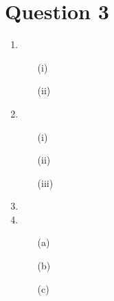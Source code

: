 \documentclass[10pt,a4paper]{article}
\begin{document}
\section*{Question 3}

\begin{enumerate}
	\item 
		\begin{itemize}
			\item[(i)]
			\item[(ii)]
		\end{itemize}
	\item
		\begin{itemize}
			\item[(i)]
			\item[(ii)]
			\item[(iii)]
		\end{itemize}
	\item
	\item
		\begin{itemize}
			\item[(a)]
			\item[(b)]
			\item[(c)]
		\end{itemize}
\end{enumerate}
\end{document}
